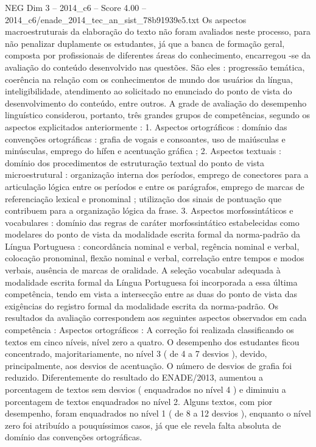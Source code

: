 \begin{textsample}{NEG Dim 3 – 2014\_c6 – Score 4.00 – 2014\_c6/enade\_2014\_tec\_an\_sist\_78b91939e5.txt}
Os aspectos macroestruturais da elaboração do texto não foram avaliados neste processo, para não penalizar duplamente os estudantes, já que a banca de formação geral, composta por profissionais de diferentes áreas do conhecimento, encarregou -se da avaliação do conteúdo desenvolvido nas questões.
São eles : progressão temática, coerência na relação com os conhecimentos de mundo dos usuários da língua, inteligibilidade, atendimento ao solicitado no enunciado do ponto de vista do desenvolvimento do conteúdo, entre outros.
A grade de avaliação do desempenho linguístico considerou, portanto, três grandes grupos de competências, segundo os aspectos explicitados anteriormente : 1.
Aspectos ortográficos : domínio das convenções ortográficas : grafia de vogais e consoantes, uso de maiúsculas e minúsculas, emprego do hífen e acentuação gráfica ; 2.
Aspectos textuais : domínio dos procedimentos de estruturação textual do ponto de vista microestrutural : organização interna dos períodos, emprego de conectores para a articulação lógica entre os períodos e entre os parágrafos, emprego de marcas de referenciação lexical e pronominal ; utilização dos sinais de pontuação que contribuem para a organização lógica da frase. 3.
Aspectos morfossintáticos e vocabulares : domínio das regras de caráter morfossintático estabelecidas como modelares do ponto de vista da modalidade escrita formal da norma-padrão da Língua Portuguesa : concordância nominal e verbal, regência nominal e verbal, colocação pronominal, flexão nominal e verbal, correlação entre tempos e modos verbais, ausência de marcas de oralidade.
A seleção vocabular adequada à modalidade escrita formal da Língua Portuguesa foi incorporada a essa última competência, tendo em vista a intersecção entre as duas do ponto de vista das exigências do registro formal da modalidade escrita da norma-padrão.
Os resultados da avaliação correspondem aos seguintes aspectos observados em cada competência : Aspectos ortográficos : A correção foi realizada classificando os textos em cinco níveis, nível zero a quatro.
O desempenho dos estudantes ficou concentrado, majoritariamente, no nível 3 ( de 4 a 7 desvios ), devido, principalmente, aos desvios de acentuação.
O número de desvios de grafia foi reduzido.
Diferentemente do resultado do ENADE/2013, aumentou a porcentagem de textos sem desvios ( enquadrados no nível 4 ) e diminuiu a porcentagem de textos enquadrados no nível 2.
Alguns textos, com pior desempenho, foram enquadrados no nível 1 ( de 8 a 12 desvios ), enquanto o nível zero foi atribuído a pouquíssimos casos, já que ele revela falta absoluta de domínio das convenções ortográficas.

\end{textsample}
